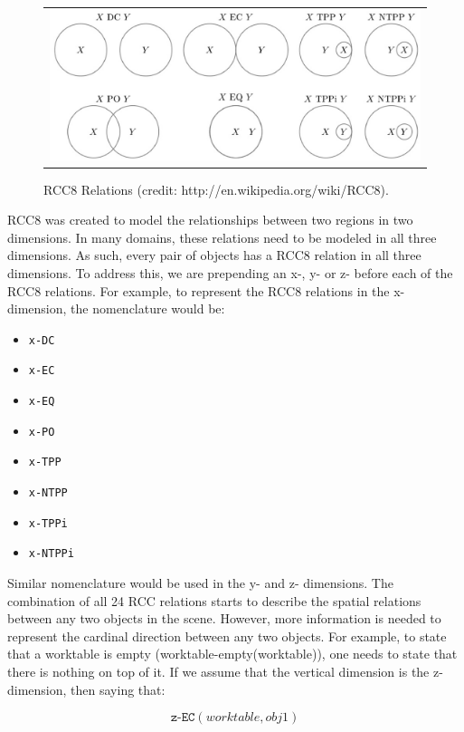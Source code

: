 \documentclass[preprint,12pt]{elsarticle}
\newcommand{\rcc}[1] {\texttt{#1}}
\begin{document}
\begin{figure}[h!t!]
\begin{center}
\begin{tabular}{c}
\includegraphics[width=12cm]{rcc8.eps}
\end{tabular}
\end{center}
\caption{RCC8 Relations (credit: http://en.wikipedia.org/wiki/RCC8).}
\label{fig:RCC8}
\end{figure}

RCC8 was created to model the relationships between two regions in two dimensions. In many domains, these relations need to be modeled in all three dimensions. As such, every pair of objects has a RCC8 relation in all three dimensions. To address this, we are prepending an x-, y- or z- before each of the RCC8 relations. For example, to represent the RCC8 relations in the x-dimension, the nomenclature would be:
\begin{itemize}
  \item \rcc{x-DC}
  \item \rcc{x-EC}
  \item \rcc{x-EQ}
  \item \rcc{x-PO}
  \item \rcc{x-TPP}
  \item \rcc{x-NTPP}
  \item \rcc{x-TPPi}
  \item \rcc{x-NTPPi}
\end{itemize}

Similar nomenclature would be used in the y- and z- dimensions. The combination of all 24 RCC relations starts to describe the spatial relations between any two objects in the scene. However, more information is needed to represent the cardinal direction between any two objects. For example, to state that a worktable is empty (worktable-empty(worktable)), one needs to state that there is nothing on top of it. If we assume that the vertical dimension is the z-dimension, then saying that:

\begin{equation}\label{eq:z-EC}
\texttt{z-EC}(\textit{worktable}, \textit{obj1})
\end{equation}
\end{document}

